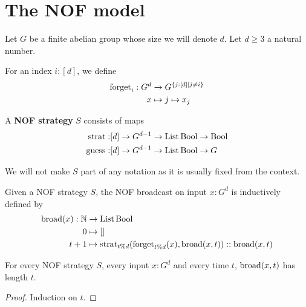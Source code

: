 \chapter{The NOF model}

Let $G$ be a finite abelian group whose size we will denote $d$. Let $d \ge 3$ a natural number.

\begin{definition}
  \label{def:forget}
  \leanok

  For an index $i : [d]$, we define
  \begin{align}
    \operatorname{forget}_i : G^d & \to G^{\{j : [d] \mid j \ne i\}} \\
    x & \mapsto j \mapsto x_j
  \end{align}
\end{definition}

\begin{definition}
  \label{def:strategy}
  \leanok

  A {\bf NOF strategy} $S$ consists of maps
  \begin{align}
    \operatorname{strat} : & [d] \to G^{d - 1} \to \operatorname{List} \operatorname{Bool} \to \operatorname{Bool} \\
    \operatorname{guess} : & [d] \to G^{d - 1} \to \operatorname{List} \operatorname{Bool} \to G
  \end{align}
\end{definition}

We will not make $S$ part of any notation as it is usually fixed from the context.

\begin{definition}
  \label{def:broadcast}
  \leanok

  Given a NOF strategy $S$, the NOF broadcast on input $x : G^d$ is inductively defined by
  \begin{align}
    \operatorname{broad}(x) : \mathbb{N} & \to \operatorname{List} \operatorname{Bool} \\
    0 & \mapsto [] \\
    t + 1 & \mapsto \operatorname{strat}_{t \% d}(\operatorname{forget}_{t \% d}(x), \operatorname{broad}(x, t)) :: \operatorname{broad}(x, t)
  \end{align}
\end{definition}

\begin{lemma}
  \label{lem:length-broadcast}
  \leanok
  For every NOF strategy $S$, every input $x : G^d$ and every time $t$, $\operatorname{broad}(x, t)$ has length $t$.
\end{lemma}
\begin{proof}
  \uses{}
  \leanok
  Induction on $t$.
\end{proof}

